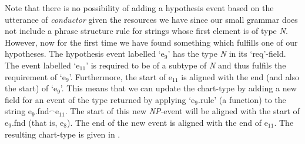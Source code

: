 Note that there is no possibility of adding a hypothesis event based
on the utterance of \textit{conductor} given the resources we have
since our small grammar does not include a phrase structure rule for
strings whose first element is of type \textit{N}.  However, now for
the first time we have found something which fulfills one of our
hypotheses.  The hypothesis event labelled `e$_9$' has the type
\textit{N} in its `req'-field.  The event labelled `e$_{11}$' is
required to be of a subtype of \textit{N} and thus fulfils the
requirement of `e$_9$'.  Furthermore, the start of e$_{11}$ is aligned
with the end (and also the start) of `e$_9$'.  This means that we can
update the chart-type by adding a new field for an event of the type
returned by applying `e$_9$.rule' (a function) to the string
e$_9$.fnd$^{\frown}$e$_{11}$.  The start of this new \textit{NP}-event
will be aligned with the start of e$_9$.fnd (that is, e$_8$).  The end
of the new event is aligned with the end of e$_{11}$.  The resulting
chart-type is given in \nexteg{}.
